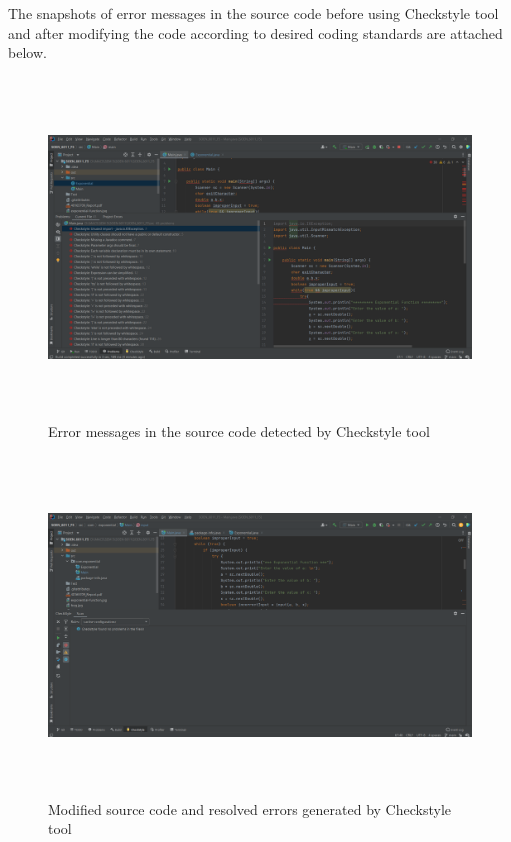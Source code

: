 \documentclass[12pt, a4paper]{article}
\begin{document}
\newpage

\noindent
The snapshots of error messages in the source code before using Checkstyle tool and after modifying the code according to desired coding standards are attached below. 

\begin{figure}[h]
  \includegraphics[width=15cm,height=9cm]{CheckStyle(Before).png}
  \caption{Error messages in the source code detected by Checkstyle tool}
  \label{fig:Debugging computation of exponential function}
\end{figure}


\begin{figure}[h!]
  \includegraphics[width=15cm,height=9cm]{CheckStyle(After).png}
  \caption{Modified source code and resolved errors generated by Checkstyle tool}
  \label{Debugging computation of fractional exponent value}
\end{figure}
\end{document}
